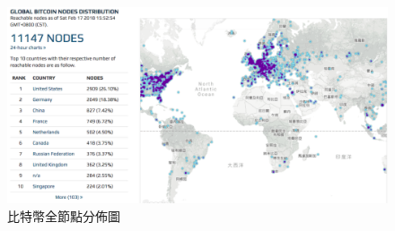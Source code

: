 		\begin{figure}
			\centering
			\includegraphics[width = .9\textwidth]{bitcoinfullnode.png}
			\caption{比特幣全節點分佈圖\supercite{bitcoinfullnode}}\label{bitcoinfullnode}
		\end{figure}





